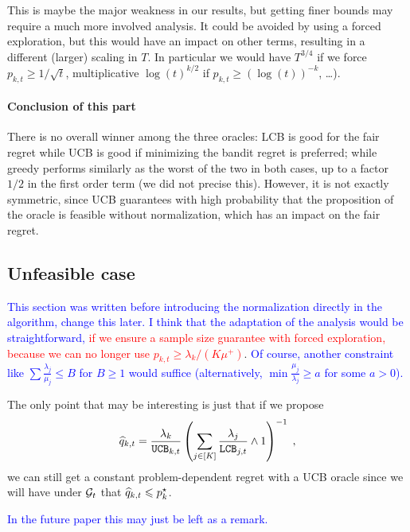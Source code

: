 \begin{remark} 
	This is maybe the major weakness in our results, but getting finer bounds may require a much more involved analysis. It could be avoided by using a forced exploration, but this would have an impact on other terms, resulting in a different (larger) scaling in $T$. In particular we would have $T^{3/4}$ if we force $p_{k,t}\geq 1/\sqrt{t}$, multiplicative $\log(t)^{k/2}$ if $p_{k,t}\geq (\log(t))^{-k}$, \dots). 
\end{remark}

\paragraph{Conclusion of this part} There is no overall winner among the three oracles: LCB is good for the fair regret while UCB is good if minimizing the bandit regret is preferred; while greedy performs similarly as the worst of the two in both cases, up to a factor $1/2$ in the first order term (we did not precise this). However, it is not exactly symmetric, since UCB guarantees with high probability that the proposition of the oracle is feasible without normalization, which has an impact on the fair regret.


\subsection{Unfeasible case}

\textcolor{blue}{This section was written before introducing the normalization directly in the algorithm, change this later. I think that the adaptation of the analysis would be straightforward,} \textcolor{red}{if we ensure a sample size guarantee with forced exploration, because we can no longer use $p_{k,t}\geq \lambda_k/(K\mu^+)$}. \textcolor{blue}{Of course, another constraint like $\sum \frac{\lambda_j}{\mu_j}\leq B$ for $B\geq 1$ would suffice (alternatively, $\min \frac{\mu_j}{\lambda_j}\geq a$ for some $a>0$).}

The only point that may be interesting is just that if we propose 
	\[ \widehat{q}_{k, t} = \frac{\lambda_k}{\texttt{UCB}_{k,t}} \left(\sum_{j \in [K]}\frac{\lambda_j}{\texttt{LCB}_{j,t}}\wedge1 \right)^{-1} \;, \]
	we can still get a constant problem-dependent regret with a UCB oracle since we will have under $\mathcal{G}_t$ that $\widehat{q}_{k, t} \leqslant p_k^\star$.
	
\textcolor{blue}{In the future paper this may just be left as a remark.}
